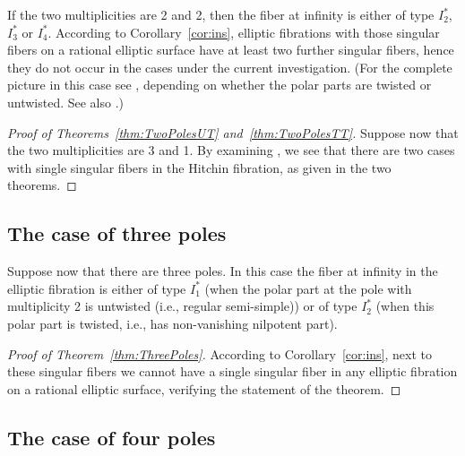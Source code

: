 \documentclass[10pt,a4paper]{amsart}
\numberwithin{equation}{section}
\begin{document}
If the two multiplicities are 2 and 2, then the fiber at infinity is
either of type $I_2^*$, $I_3^*$ or $I_4^*$. According to
Corollary~\ref{cor:ins}, elliptic fibrations with those singular fibers
on a rational elliptic surface have at least two further singular fibers,
hence they do not occur in the cases under the current investigation.
(For the complete picture in this case see
\cite[Theorems~{2.1,~2.2,~2.3}]{ISS2}, depending on whether the polar
parts are twisted or untwisted. See also \cite[Table~1]{ISS2}.)

\begin{proof}[Proof of Theorems~\ref{thm:TwoPolesUT} and~\ref{thm:TwoPolesTT}]
Suppose now that the two mul\-ti\-pli\-ci\-ties are 3 and 1. By
examining \cite[Theorems~{2.4,~2.5,~2.6,~2.7}]{ISS2}, we see that there
are two cases with single singular fibers in the Hitchin fibration,
as given in the two theorems.
\end{proof}


\subsection{The case of three poles}
Suppose now that there are three poles. In this case the fiber at
infinity in the elliptic fibration is either of type $I_1^*$ (when the
polar part at the pole with multiplicity 2 is untwisted (i.e., regular
semi-simple)) or of type $I_2^*$ (when this polar part is twisted, i.e., has non-vanishing nilpotent part).

\begin{proof}[Proof of Theorem~\ref{thm:ThreePoles}]
According to Corollary~\ref{cor:ins}, next to these singular fibers
we cannot have a single singular fiber in any elliptic fibration on a
rational elliptic surface, verifying the statement of the theorem.
\end{proof}

\subsection{The case of four poles}
\end{document}
